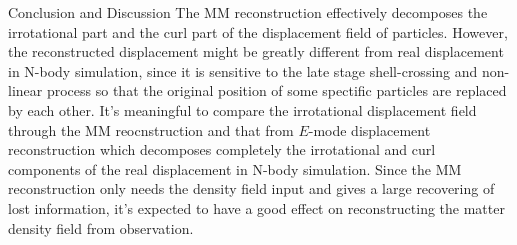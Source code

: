 \begin{section}{Conclusion and Discussion}
   The MM reconstruction effectively decomposes the irrotational part and the curl part of the displacement 
field of particles. However, the reconstructed displacement might be greatly different from real displacement in N-body 
simulation, since it is sensitive to the late stage shell-crossing and non-linear process so that the original 
position of some spectific particles are replaced by each other. It's meaningful to compare the irrotational 
displacement field through the MM reocnstruction and that from $E$-mode displacement reconstruction \cite{bib:Yu2016} 
which decomposes completely the irrotational and curl components of the real displacement in N-body simulation. 
Since the MM reconstruction only needs the density field input and gives a large recovering of lost information, 
it's expected to have a good effect on reconstructing the matter density field from observation.
\end{section}
